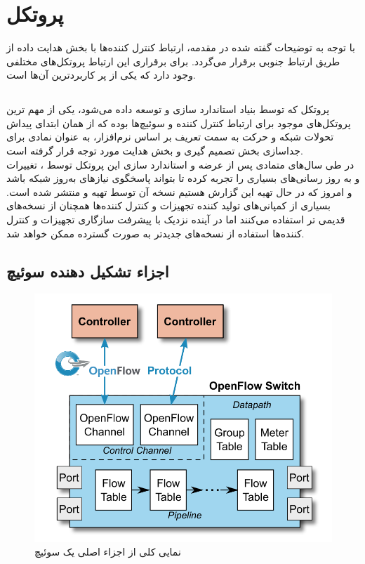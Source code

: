 \chapter{پروتکل }
با توجه به توضیحات گفته شده در مقدمه، ارتباط کنترل کننده‌ها با بخش هدایت داده از طریق ارتباط جنوبی برقرار می‌گردد. برای برقراری این ارتباط پروتکل‌های مختلفی وجود دارد که  یکی از پر کاربردترین آن‌ها است.

\section{}
پروتکل  که توسط بنیاد  استاندارد سازی و توسعه داده می‌شود، یکی از مهم ترین پروتکل‌های موجود برای ارتباط کنترل کننده و سوئیچ‌ها بوده که از همان ابتدای پیداش تحولات شبکه و حرکت به سمت تعریف بر اساس نرم‌افزار، به عنوان نمادی برای جداسازی بخش تصمیم گیری و بخش هدایت مورد توجه قرار گرفته است.\\
در طی سال‌های متمادی پس از عرضه و استاندارد سازی این پروتکل توسط ، تغییرات و به روز رسانی‌های بسیاری را تجربه کرده تا بتواند پاسخگوی نیاز‌های به‌روز شبکه باشد و امروز که در حال تهیه این گزارش هستیم نسخه  آن توسط  تهیه و منتشر شده است. بسیاری از کمپانی‌های تولید کننده تجهیزات  و کنترل کننده‌ها همچنان از نسخه‌های قدیمی تر استفاده می‌کنند اما در آینده نزدیک با پیشرفت سازگاری تجهیزات و کنترل کننده‌ها استفاده از نسخه‌های جدیدتر به صورت گسترده ممکن خواهد شد.

\section{اجزاء تشکیل دهنده سوئیچ }

\begin{figure}
	\centering
	\includegraphics[scale=0.4]{imgs/of_comp.png}
	\caption{نمایی کلی از اجزاء اصلی یک سوئیچ  \cite{spec}}
	\label{fig4}
\end{figure}


